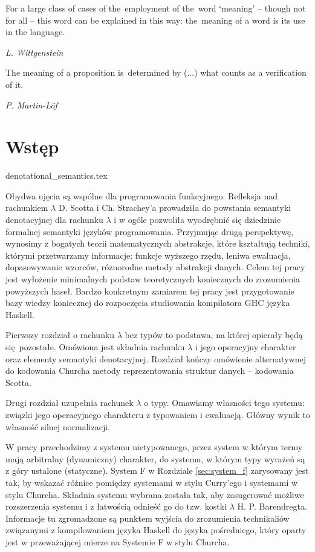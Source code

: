 \epigraph{
For a large class of cases of the~employment of the~word ‘meaning’ -- though not for all -- this word can be explained in this way: the~meaning of a word is its use in the language. \cite{Wittgenstein53}
}{\emph{\small{L. Wittgenstein}}}

\epigraph{The meaning of a proposition is~determined by (...) what counts as a
verification of it. \cite{Lof_96}}{\emph{\small{{P. Martin-Löf}}}}


\section*{Wstęp}
{denotational_semantics.tex}

Obydwa ujęcia są wspólne dla programowania funkcyjnego. Refleksja nad rachunkiem \(\lambda\) D. Scotta i Ch. Strachey'a prowadziła do powstania semantyki denotacyjnej dla rachunku \(\lambda\) i w ogóle pozwoliła wyodrębnić się dziedzinie formalnej semantyki języków programowania. Przyjmując drugą perspektywę, wynosimy z bogatych teorii matematycznych abstrakcje, które kształtują techniki, którymi przetwarzamy informacje: funkcje wyższego rzędu, leniwa ewaluacja, dopasowywanie wzorców, różnorodne metody abstrakcji danych. 
Celem tej pracy jest wyłożenie minimalnych podstaw teoretycznych koniecznych do zrozumienia powyższych haseł. Bardzo konkretnym zamiarem tej pracy jest przygotowanie bazy wiedzy koniecznej do rozpoczęcia studiowania kompilatora GHC języka Haskell.

Pierwszy rozdział o rachunku \(\lambda\) bez typów to podstawa, na której opierały będą się pozostałe. Omówiona jest składnia rachunku \(\lambda\) i jego operacyjny charakter oraz elementy semantyki denotacyjnej. Rozdział kończy omówienie alternatywnej do kodowania Churcha metody reprezentowania struktur danych -- kodowania Scotta.

Drugi rozdział uzupełnia rachunek \(\lambda\) o typy. Omawiamy własności tego systemu: związki jego operacyjnego charakteru z typowaniem i ewaluacją. Główny wynik to własność silnej normalizacji.

W pracy przechodzimy z systemu nietypowanego, przez system w którym termy mają arbitralny (dynamiczny) charakter, do systemu, w którym typy wyrażeń są z góry ustalone (statyczne). System F w Rozdziale \ref{sec:system_f} zarysowany jest tak, by wskazać różnice pomiędzy systemami w stylu Curry'ego i systemami w stylu Churcha. Składnia systemu wybrana została tak, aby zasugerować możliwe rozszerzenia systemu i z łatwością odnieść go do tzw. kostki \(\lambda\) H. P. Barendregta. Informacje tu zgromadzone są punktem wyjścia do zrozumienia technikaliów związanymi z kompilowaniem języka Haskell do języka pośredniego, który oparty jest w przeważającej mierze na Systemie F w stylu Churcha. 
